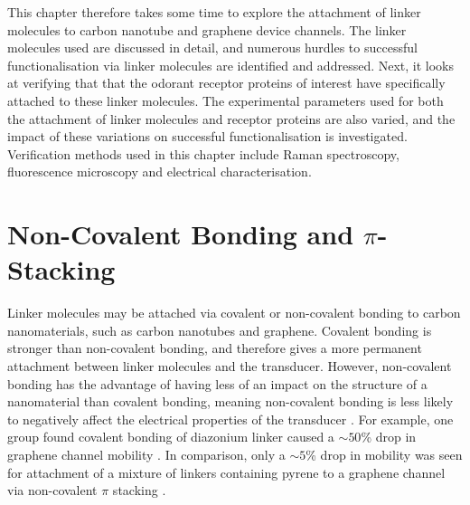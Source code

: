 \documentclass[
  a4paper,
]{scrbook}
\begin{document}
This chapter therefore takes some time to explore the attachment of
linker molecules to carbon nanotube and graphene device channels. The
linker molecules used are discussed in detail, and numerous hurdles to
successful functionalisation via linker molecules are identified and
addressed. Next, it looks at verifying that that the odorant receptor
proteins of interest have specifically attached to these linker
molecules. The experimental parameters used for both the attachment of
linker molecules and receptor proteins are also varied, and the impact
of these variations on successful functionalisation is investigated.
Verification methods used in this chapter include Raman spectroscopy,
fluorescence microscopy and electrical characterisation.

\hypertarget{non-covalent-bonding-and-pi-stacking}{%
\section{\texorpdfstring{Non-Covalent Bonding and
\(\pi\)-Stacking}{Non-Covalent Bonding and \textbackslash pi-Stacking}}\label{non-covalent-bonding-and-pi-stacking}}

Linker molecules may be attached via covalent or non-covalent bonding to
carbon nanomaterials, such as carbon nanotubes and graphene. Covalent
bonding is stronger than non-covalent bonding, and therefore gives a
more permanent attachment between linker molecules and the transducer.
However, non-covalent bonding has the advantage of having less of an
impact on the structure of a nanomaterial than covalent bonding, meaning
non-covalent bonding is less likely to negatively affect the electrical
properties of the transducer
\autocite{Long2012,DiCrescenzo2014,Wang2020,Mishyn2022}. For example,
one group found covalent bonding of diazonium linker caused a
\(\sim 50\)\% drop in graphene channel mobility \autocite{Lerner2014}.
In comparison, only a \(\sim 5\)\% drop in mobility was seen for
attachment of a mixture of linkers containing pyrene to a graphene
channel via non-covalent \(\pi\) stacking \autocite{Thodkar2021}.
\end{document}
